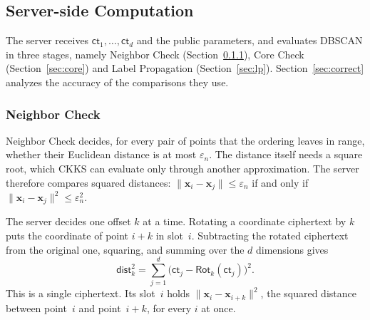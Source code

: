 
\subsection{Server-side Computation}
\label{sec:server}

The server receives $\mathsf{ct}_1, \dots, \mathsf{ct}_d$ and the
public parameters, and evaluates DBSCAN in three stages, namely
Neighbor Check (Section~\ref{sec:neighbor}), Core Check
(Section~\ref{sec:core}) and
Label Propagation (Section~\ref{sec:lp}). Section~\ref{sec:correct}
analyzes the accuracy of the comparisons they use.

\subsubsection{Neighbor Check}
\label{sec:neighbor}

Neighbor Check decides, for every pair of points that the ordering
leaves in range, whether their Euclidean distance is at most
$\varepsilon_n$. The distance itself needs a square root, which CKKS can
evaluate only through another approximation. The server therefore
compares squared distances: $\|\mathbf{x}_i - \mathbf{x}_j\| \le
\varepsilon_n$ if and only if $\|\mathbf{x}_i - \mathbf{x}_j\|^2 \le
\varepsilon_n^2$.

The server decides one offset $k$ at a time. Rotating a coordinate
ciphertext by $k$ puts the coordinate of point $i+k$ in slot~$i$.
Subtracting the rotated ciphertext from the original one, squaring, and
summing over the $d$ dimensions gives
\begin{equation}
  \label{eq:dist}
  \mathsf{dist}_k^{2} = \sum_{j=1}^{d}
    \bigl( \mathsf{ct}_j - \mathsf{Rot}_k(\mathsf{ct}_j) \bigr)^{2}.
\end{equation}
This is a single ciphertext. Its slot~$i$ holds
$\|\mathbf{x}_i - \mathbf{x}_{i+k}\|^2$, the squared distance between
point~$i$ and point~$i+k$, for every $i$ at once.


